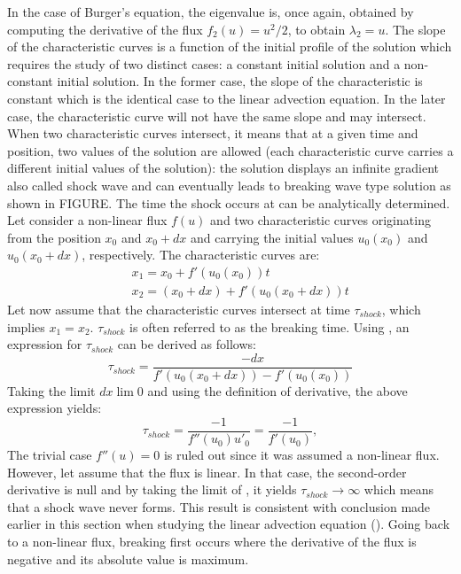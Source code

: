 In the case of Burger's equation, the eigenvalue is, once again, obtained by computing the derivative of the flux $f_2(u) = u^2/2$, to obtain $\lambda_2 = u$. The slope of the characteristic curves is a function of the initial profile of the solution which requires the study of two distinct cases: a constant initial solution and a non-constant initial solution. In the former case, the slope of the characteristic is constant which is the identical case to the linear advection equation. In the later case, the characteristic curve will not have the same slope and may intersect. When two characteristic curves intersect, it means that at a given time and position, two values of the solution are allowed (each characteristic curve carries a different initial values of the solution): the solution displays an infinite gradient also called shock wave and can eventually leads to breaking wave type solution as shown in FIGURE. The time the shock occurs at can be analytically determined. Let consider a non-linear flux $f(u)$ and two characteristic curves originating from the position $x_0$ and $x_0+dx$ and carrying the initial values $u_0(x_0)$ and $u_0(x_0+dx)$, respectively. The characteristic curves are:
%
\begin{eqnarray}\label{eq:cc1_sct1b}
&&x_1 = x_0 + f'(u_0(x_0)) t \nonumber \\ 
&&x_2 = (x_0 + dx) + f'(u_0(x_0+dx)) t \nonumber 
\end{eqnarray}
%
Let now assume that the characteristic curves intersect at time $\tau_{shock}$, which implies $x_1 = x_2$. $\tau_{shock}$ is often referred to as the breaking time. Using , an expression for $\tau_{shock}$ can be derived as follows: 
\begin{equation}
\tau_{shock} = \frac{-dx}{f'(u_0(x_0+dx))-f'(u_0(x_0))}
\end{equation} 
Taking the limit $dx \lim 0$ and using the definition of derivative, the above expression yields:
\begin{equation}\label{eq:cc2_sct1b}
\tau_{shock} = \frac{-1}{f''(u_0) u'_0} = \frac{-1}{f'(u_0)},
\end{equation} 
The trivial case $f''(u) = 0$ is ruled out since it was assumed a non-linear flux. However, let assume that the flux is linear. In that case, the second-order derivative is null and by taking the limit of , it yields $\tau_{shock} \to \infty$ which means that a shock wave never forms. This result is consistent with conclusion made earlier in this section when studying the linear advection equation (). Going back to a non-linear flux, breaking first occurs where the derivative of the flux is negative and its absolute value is maximum.   \\
